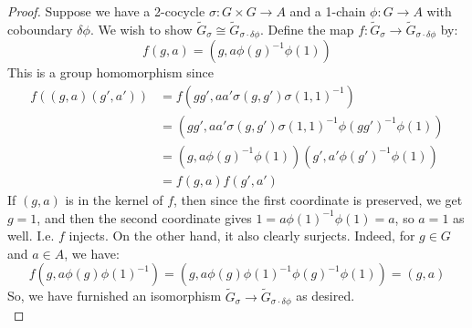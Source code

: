 \begin{proof}
	Suppose we have a 2-cocycle $\sigma : G \times G \to A$ and a 1-chain $\phi : G \to A$ with coboundary $\delta\phi$. We wish to show $\tilde{G}_\sigma \cong \tilde{G}_{\sigma\cdot\delta\phi}$. Define the map $f : \tilde{G}_\sigma \to \tilde{G}_{\sigma \cdot \delta\phi}$ by:
	\[ f(g,a) = (g,a\phi(g)^{-1}\phi(1)) \]
	This is a group homomorphism since
	\begin{align*}
	f((g,a)(g',a'))
		&= f(gg',aa'\sigma(g,g')\sigma(1,1)^{-1}) \\
		&= (gg',aa'\sigma(g,g')\sigma(1,1)^{-1}\phi(gg')^{-1}\phi(1)) \\
		&= (g,a\phi(g)^{-1}\phi(1))(g',a'\phi(g')^{-1}\phi(1)) \\
		&= f(g,a)f(g',a')
	\end{align*}
	If $(g,a)$ is in the kernel of $f$, then since the first coordinate is preserved, we get $g = 1$, and then the second coordinate gives $1 = a\phi(1)^{-1}\phi(1) = a$, so $a=1$ as well. I.e. $f$ injects. On the other hand, it also clearly surjects. Indeed, for $g \in G$ and $a \in A$, we have:
	\[ f(g,a\phi(g)\phi(1)^{-1}) = (g,a\phi(g)\phi(1)^{-1}\phi(g)^{-1}\phi(1)) = (g,a) \]
	So, we have furnished an isomorphism $\tilde{G}_\sigma \to \tilde{G}_{\sigma \cdot \delta\phi}$ as desired. \\
	

\end{proof}
